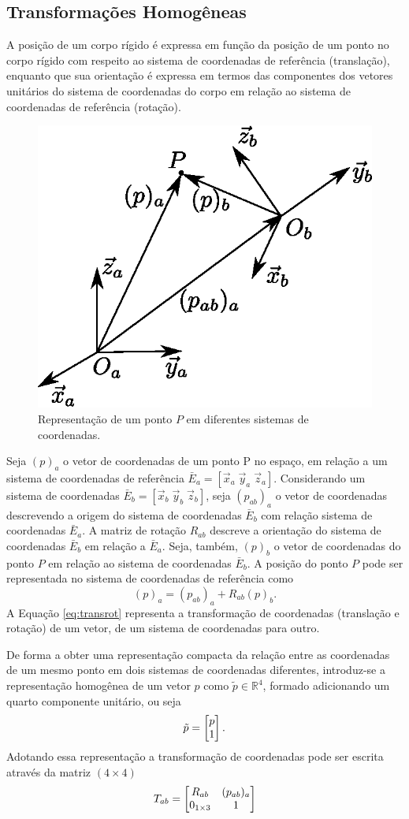 \subsection{Transformações Homogêneas}
A posição de um corpo rígido é expressa em função da posição de um ponto no corpo rígido com respeito ao sistema de coordenadas de referência (translação),
 enquanto que sua orientação é expressa em termos das componentes dos vetores unitários do sistema de coordenadas do corpo em relação ao sistema de coordenadas de referência (rotação).


\begin{figure}[!h]
  \centering
  \includegraphics[width=0.4\linewidth]{./img/homogeneous_transform}
  \caption{Representação de um ponto $P$ em diferentes sistemas de coordenadas.}
  \label{fig:homogeneous_transform}
\end{figure}


Seja $(p)_a$ o vetor de coordenadas de um ponto P no espaço, em relação a um sistema de coordenadas de referência $\bar{E}_a = [\vec{x}_a \; \vec{y}_a \; \vec{z}_a ]$. 
Considerando um sistema de coordenadas  $\bar{E}_b = [\vec{x}_b \; \vec{y}_b \; \vec{z}_b]$, seja $(p_{ab})_a$ o vetor de coordenadas descrevendo a origem do sistema de coordenadas $\bar{E}_b$ com relação sistema de coordenadas  $\bar{E}_a$. A matriz de rotação $R_{ab}$ descreve a orientação do sistema de coordenadas $\bar{E}_b$ em relação a $\bar{E}_a$. Seja, também, $(p)_b$ o vetor de coordenadas do ponto $P$ em relação ao sistema de coordenadas $\bar{E}_b$.  A posição do ponto $P$ pode ser representada no sistema de coordenadas de referência como
\begin{equation} \label{eq:transrot}
(p)_a = (p_{ab})_a + R_{ab} (p)_b.
\end{equation}
A Equação \eqref{eq:transrot} representa a transformação de coordenadas (translação e rotação) de um vetor, de um sistema de coordenadas para outro.

De forma a obter uma representação compacta da relação entre as coordenadas de um mesmo ponto em dois sistemas de coordenadas diferentes, introduz-se a representação homogênea de um vetor $p$ como $\tilde{p} \in \mathbb{R}^4$, formado adicionando um quarto componente unitário, ou seja
\begin{equation}
\tilde{p} = \begin{bmatrix}p \\ 1\end{bmatrix}.
\end{equation}  
Adotando essa representação a transformação de coordenadas pode ser escrita através da matriz $(4 \times 4) $
\begin{equation}
T_{ab} = \begin{bmatrix}
    R_{ab} & (p_{ab})_a \\
    0_{1 \times 3} & 1
\end{bmatrix}
\end{equation}


